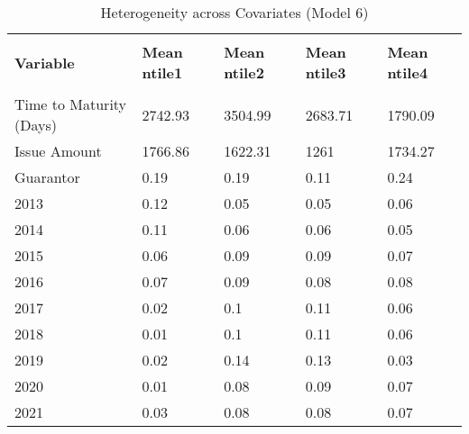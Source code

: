\begin{table}[H]
\caption{Heterogeneity across Covariates (Model 6)}
\label{Het}
\footnotesize
\begin{tabular}{lllll}
\\[-1.8ex]\hline 
\hline \\[-1.8ex] 
{\color[HTML]{333333} \textbf{Variable}} & {\color[HTML]{333333} \textbf{Mean ntile1}} & {\color[HTML]{333333} \textbf{Mean ntile2}} & {\color[HTML]{333333} \textbf{Mean ntile3}} & {\color[HTML]{333333} \textbf{Mean ntile4}} \\
\hline \\[-1.8ex] 
Time to   Maturity (Days) & \cellcolor[HTML]{A7DAB6}2742.93 & \cellcolor[HTML]{63BE7B}3504.99 & \cellcolor[HTML]{ADDCBB}2683.71 & \cellcolor[HTML]{FCFCFF}1790.09 \\
Issue Amount & \cellcolor[HTML]{63BE7B}1766.86 & \cellcolor[HTML]{8FD0A1}1622.31 & \cellcolor[HTML]{FCFCFF}1261 & \cellcolor[HTML]{6DC284}1734.27 \\
Guarantor & \cellcolor[HTML]{DFF1E6}0.19 & \cellcolor[HTML]{DFF1E6}0.19 & \cellcolor[HTML]{ECF6F1}0.11 & \cellcolor[HTML]{D8EEE0}0.24 \\
2013 & \cellcolor[HTML]{EAF5F0}0.12 & \cellcolor[HTML]{F5F9F9}0.05 & \cellcolor[HTML]{F5F9F9}0.05 & \cellcolor[HTML]{F3F9F8}0.06 \\
2014 & \cellcolor[HTML]{ECF6F1}0.11 & \cellcolor[HTML]{F3F9F8}0.06 & \cellcolor[HTML]{F3F9F8}0.06 & \cellcolor[HTML]{F5F9F9}0.05 \\
2015 & \cellcolor[HTML]{F3F9F8}0.06 & \cellcolor[HTML]{EFF7F4}0.09 & \cellcolor[HTML]{EFF7F4}0.09 & \cellcolor[HTML]{F2F8F6}0.07 \\
2016 & \cellcolor[HTML]{F2F8F6}0.07 & \cellcolor[HTML]{EFF7F4}0.09 & \cellcolor[HTML]{F0F8F5}0.08 & \cellcolor[HTML]{F0F8F5}0.08 \\
2017 & \cellcolor[HTML]{F9FBFD}0.02 & \cellcolor[HTML]{EDF6F2}0.1 & \cellcolor[HTML]{ECF6F1}0.11 & \cellcolor[HTML]{F3F9F8}0.06 \\
2018 & \cellcolor[HTML]{FBFCFE}0.01 & \cellcolor[HTML]{EDF6F2}0.1 & \cellcolor[HTML]{ECF6F1}0.11 & \cellcolor[HTML]{F3F9F8}0.06 \\
2019 & \cellcolor[HTML]{F9FBFD}0.02 & \cellcolor[HTML]{E7F4ED}0.14 & \cellcolor[HTML]{E9F4EE}0.13 & \cellcolor[HTML]{F8FBFC}0.03 \\
2020 & \cellcolor[HTML]{FBFCFE}0.01 & \cellcolor[HTML]{F0F8F5}0.08 & \cellcolor[HTML]{EFF7F4}0.09 & \cellcolor[HTML]{F2F8F6}0.07 \\
2021 & \cellcolor[HTML]{F8FBFC}0.03 & \cellcolor[HTML]{F0F8F5}0.08 & \cellcolor[HTML]{F0F8F5}0.08 & \cellcolor[HTML]{F2F8F6}0.07 \\

\end{tabular}
\end{table}
